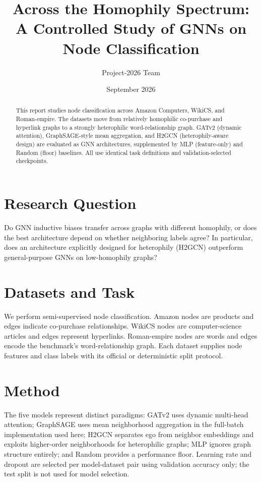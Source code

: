 \documentclass[11pt]{article}
\title{Across the Homophily Spectrum: A Controlled Study of GNNs on Node Classification}
\author{Project-2026 Team}
\date{September 2026}
\begin{document}
\maketitle
\begin{abstract}
This report studies node classification across Amazon Computers, WikiCS, and Roman-empire. The datasets move from relatively homophilic co-purchase and hyperlink graphs to a strongly heterophilic word-relationship graph. GATv2 (dynamic attention), GraphSAGE-style mean aggregation, and H2GCN (heterophily-aware design) are evaluated as GNN architectures, supplemented by MLP (feature-only) and Random (floor) baselines. All use identical task definitions and validation-selected checkpoints.
\end{abstract}
\section{Research Question}
Do GNN inductive biases transfer across graphs with different homophily, or does the best architecture depend on whether neighboring labels agree? In particular, does an architecture explicitly designed for heterophily (H2GCN) outperform general-purpose GNNs on low-homophily graphs?
\section{Datasets and Task}
We perform semi-supervised node classification. Amazon nodes are products and edges indicate co-purchase relationships. WikiCS nodes are computer-science articles and edges represent hyperlinks. Roman-empire nodes are words and edges encode the benchmark's word-relationship graph. Each dataset supplies node features and class labels with its official or deterministic split protocol.
\section{Method}
The five models represent distinct paradigms: GATv2 uses dynamic multi-head attention; GraphSAGE uses mean neighborhood aggregation in the full-batch implementation used here; H2GCN separates ego from neighbor embeddings and exploits higher-order neighborhoods for heterophilic graphs; MLP ignores graph structure entirely; and Random provides a performance floor. Learning rate and dropout are selected per model-dataset pair using validation accuracy only; the test split is not used for model selection.
\end{document}
